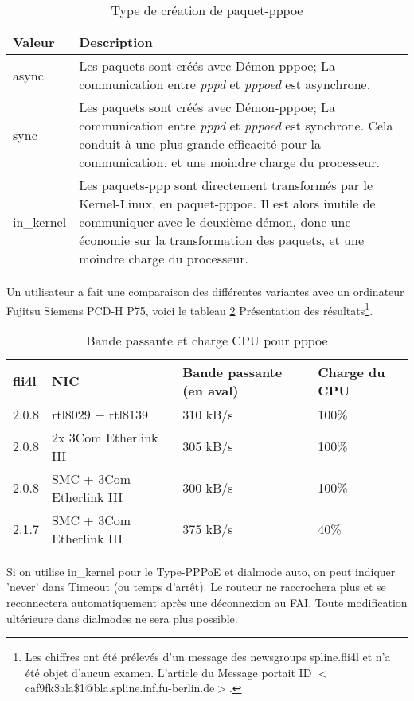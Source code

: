 \begin{description}
\begin{table}[h!]
  \centering
  \begin{tabular}{|l|p{10cm}|}
    \hline
    Valeur & Description \\
    \hline
    async & Les paquets sont créés avec Démon-pppoe; La
    communication entre \emph{pppd} et \emph{pppoed} est asynchrone. \\
    sync & Les paquets sont créés avec Démon-pppoe; La
    communication entre \emph{pppd} et \emph{pppoed} est synchrone.
    Cela conduit à une plus grande efficacité pour la communication,
    et une moindre charge du processeur. \\
    in\_kernel & Les paquets-ppp sont directement transformés par le
    Kernel-Linux, en paquet-pppoe. Il est alors inutile de communiquer
    avec le deuxième démon, donc une économie sur la transformation
    des paquets, et une moindre charge du processeur. \\
    \hline
  \end{tabular}
  \caption{Type de création de paquet-pppoe}
  \label{tab:pppoe-type}
\end{table}

Un utilisateur a fait une comparaison des différentes variantes avec un
ordinateur Fujitsu Siemens PCD-H P75, voici le tableau
\ref{tab:pppoe-type-load} Présentation des résultats\footnote{Les chiffres ont
été prélevés d'un message des newsgroups spline.fli4l et n'a été objet 
d'aucun examen. L'article du Message portait ID 
$<$caf9fk\$ala\$1@bla.spline.inf.fu-berlin.de$>$.}.
\begin{table}[h!]
  \centering
  \begin{tabular}[h]{|l|l|l|l|}
    \hline
    fli4l & NIC & Bande passante (en aval) & Charge du CPU \\
    \hline
    2.0.8 & rtl8029 + rtl8139 & 310 kB/s  &100\% \\
    2.0.8 & 2x 3Com Etherlink III & 305 kB/s & 100\% \\
    2.0.8 & SMC + 3Com Etherlink III & 300 kB/s & 100\% \\
    2.1.7 & SMC + 3Com Etherlink III & 375 kB/s & 40\%\\
    \hline
  \end{tabular}
  \caption{Bande passante et charge CPU pour pppoe}
  \label{tab:pppoe-type-load}
\end{table}


Si on utilise in\_kernel pour le Type-PPPoE et dialmode auto, on peut
indiquer 'never' dans Timeout (ou temps d'arrêt). Le routeur ne raccrochera plus et se
reconnectera automatiquement après une déconnexion au FAI, Toute
modification ultérieure dans dialmodes ne sera plus possible.

\end{description}

